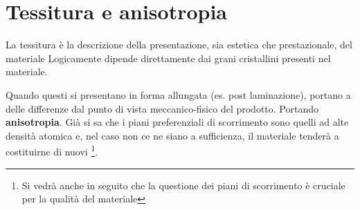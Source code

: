 \section{Tessitura e anisotropia}
La tessitura è la descrizione della presentazione, sia estetica che prestazionale, del materiale
Logicamente dipende direttamente dai grani cristallini presenti nel materiale.

Quando questi si presentano in forma allungata (es. post laminazione), portano 
a delle differenze dal punto di vista meccanico-fisico del prodotto. 
Portando \textbf{anisotropia}.
Già si sa che i piani preferenziali di scorrimento sono quelli ad alte densità atomica
e, nel caso non ce ne siano a sufficienza, il materiale tenderà a costituirne di nuovi%
\footnote{Si vedrà anche in seguito che la questione dei piani di scorrimento è cruciale per la qualità del materiale}.

